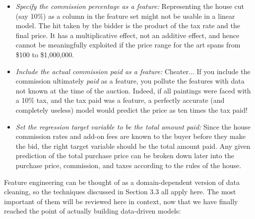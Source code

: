 \documentclass[10pt]{article}
\begin{document}
\begin{enumerate}
\begin{itemize}
  \item \textit{Specify the commission percentage as a feature:} Representing the house cut (say 10\%) as a column in the feature set might not be usable in a linear model. The hit taken by the bidder is the product of the tax rate and the final price. It has a multiplicative effect, not an additive effect, and hence cannot be meaningfully exploited if the price range for the art spans from \$100 to \$1,000,000.
  \item \textit{Include the actual commission paid as a feature:} Cheater... If you include the commission ultimately \textit{paid} as a feature, you pollute the features with data not known at the time of the auction. Indeed, if all paintings were faced with a 10\% tax, and the tax paid was a feature, a perfectly accurate (and completely useless) model would predict the price as ten times the tax paid!
  \item \textit{Set the regression target variable to be the total amount paid:} Since the house commission rates and add-on fees are known to the buyer before they make the bid, the right target variable should be the total amount paid. Any given prediction of the total purchase price can be broken down later into the purchase price, commission, and taxes according to the rules of the house.
\end{itemize}

Feature engineering can be thought of as a domain-dependent version of data cleaning, so the techniques discussed in Section 3.3 all apply here. The most important of them will be reviewed here in context, now that we have finally reached the point of actually building data-driven models:


\end{enumerate}
\end{document}
